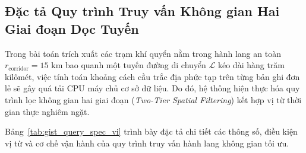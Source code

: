 \subsection{Đặc tả Quy trình Truy vấn Không gian Hai Giai đoạn Dọc Tuyến}
Trong bài toán trích xuất các trạm khí quyển nằm trong hành lang an toàn $r_{\text{corridor}} = 15\text{ km}$ bao quanh một tuyến đường di chuyển $\mathcal{L}$ kéo dài hàng trăm kilômét, việc tính toán khoảng cách cầu trắc địa phức tạp trên từng bản ghi đơn lẻ sẽ gây quá tải CPU máy chủ cơ sở dữ liệu. Do đó, hệ thống hiện thực hóa quy trình lọc không gian hai giai đoạn (\textit{Two-Tier Spatial Filtering}) kết hợp vị từ thời gian thực nghiêm ngặt.

Bảng~\ref{tab:gist_query_spec_vi} trình bày đặc tả chi tiết các thông số, điều kiện vị từ và cơ chế vận hành của quy trình truy vấn hành lang không gian tối ưu.

